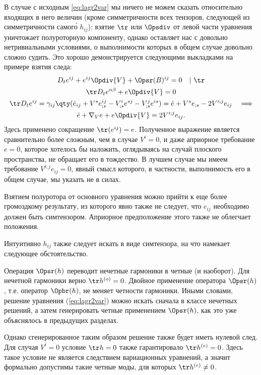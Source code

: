 \documentclass[\docroot/reports/draft/report.tex]{subfiles}
\begin{document}
    В случае с исходным \autoref{eq:lagr2var} мы ничего не можем сказать относительно входящих в него величин (кроме симметричности всех тензоров, следующей из симметричности самог\'{о} $h_{ij}$): взятие $\tr$ или $\Opsdiv$ от левой части уравнения уничтожает полуроторную компоненту, однако оставляет нас с довольно нетривиальными условиями, о выполнимости которых в общем случае довольно сложно судить. Это хорошо демонстрируется следующими выкладками на примере взятия следа:
    \begin{gather*}
        D_t{e^{ij}} + e^{ij} \Opdiv{V} + \Opsr(B)^{ij} = 0 \quad |\ \tr \\
        \tr D_t{e^{\alpha\beta}} + e \Opdiv{V} = 0 \\
        \tr D_t{e^{ij}} = \gamma_{ij} \qty(
            \dot{e}_{ij} + V^s e^{ij}_{;s} - V^i_{;s} e^{sj} - V^j_{;s} e^{is}
        ) = \dot{e} + V^s e_{;s} - 2 V^{i;j} e_{ij} \quad\Longrightarrow\\
        \dot{e} + \nabla_V e + e \Opdiv{V} = 2 V^{i;j} e_{ij} .
    \end{gather*}
    Здесь применено сокращение $\tr(e^{ij}) = e$. Полученное выражение является сравнительно более сложным, чем в случае $V^i = 0$, и даже априорное требование $e = 0$, которое хотелось бы наложить, оглядываясь на случай плоского пространства, не обращает его в тождество. В лучшем случае мы имеем требование $V^{i;j} e_{ij} = 0$, явный смысл которого, в частности, выполнимость его в общем случае, мы указать не в силах.

    Взятием полуротора от основного уравнения можно прийти к еще более громоздкому результату, из которого явно также не следует, что $e_{ij}$ необходимо должен быть симтензором. Априорное предположение этого также не облегчает положения.

    Интуитивно $h_{ij}$ также следует искать в виде симтензора, на что намекает следующее обстоятельство.

    Операция $\Opsr(h)$ переводит нечетные гармоники в четные (и наоборот). Для нечетной гармоники верно $\tr h^{(o)} = 0$. Двойное применение оператора $\Opsr(h)$, т.е. оператор $\Opbr(h)$, не меняет четности гармоники. Иными словами, решение уравнения (\ref{eq:lagr2var}) можно искать сначала в классе нечетных решений, а затем генерировать четные применением $\Opsr(h)$, как это уже объяснялось в предыдущих разделах.

    Однако сгенерированное таким образом решение также будет иметь нулевой след. Для случая $V^i = 0$ условие $\tr h = 0$ также гарантировало $\tr h^{(e)} = 0$. Здесь такое условие не является следствием вариационных уравнений, а значит формально допустимы такие четные моды, для которых $\tr h^{(e)} \neq 0$.
\end{document}
